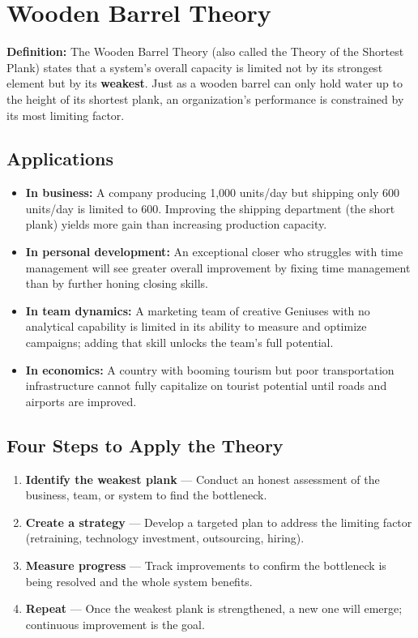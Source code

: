 \documentclass[11pt, letterpaper]{article}
\begin{document}
\section{Wooden Barrel Theory}

\begin{defbox}
\textbf{Definition:} The Wooden Barrel Theory (also called the Theory of the Shortest Plank) states that a system's overall capacity is limited not by its strongest element but by its \textbf{weakest}. Just as a wooden barrel can only hold water up to the height of its shortest plank, an organization's performance is constrained by its most limiting factor.
\end{defbox}

\subsection{Applications}

\begin{itemize}[leftmargin=*]
  \item \textbf{In business:} A company producing 1,000 units/day but shipping only 600 units/day is limited to 600. Improving the shipping department (the short plank) yields more gain than increasing production capacity.
  \item \textbf{In personal development:} An exceptional closer who struggles with time management will see greater overall improvement by fixing time management than by further honing closing skills.
  \item \textbf{In team dynamics:} A marketing team of creative Geniuses with no analytical capability is limited in its ability to measure and optimize campaigns; adding that skill unlocks the team's full potential.
  \item \textbf{In economics:} A country with booming tourism but poor transportation infrastructure cannot fully capitalize on tourist potential until roads and airports are improved.
\end{itemize}

\subsection{Four Steps to Apply the Theory}

\begin{enumerate}[leftmargin=*, label=\textbf{\arabic*.}]
  \item \textbf{Identify the weakest plank} --- Conduct an honest assessment of the business, team, or system to find the bottleneck.
  \item \textbf{Create a strategy} --- Develop a targeted plan to address the limiting factor (retraining, technology investment, outsourcing, hiring).
  \item \textbf{Measure progress} --- Track improvements to confirm the bottleneck is being resolved and the whole system benefits.
  \item \textbf{Repeat} --- Once the weakest plank is strengthened, a new one will emerge; continuous improvement is the goal.
\end{enumerate}
\end{document}
